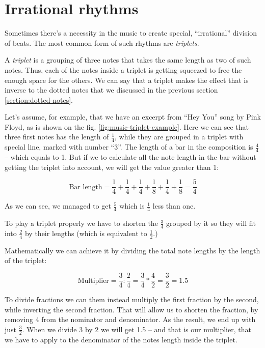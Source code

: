 \documentclass[../sparc.tex]{subfiles}
\begin{document}
\section{Irrational rhythms}

Sometimes there's a necessity in the music to create special, ``irrational''
division of beats.  The most common form of such rhythms are \emph{triplets}.

A \emph{triplet} is a grouping of three notes that takes the same length as two
of such notes.  Thus, each of the notes inside a triplet is getting squeezed to
free the enough space for the others.  We can say that a triplet makes the
effect that is inverse to the dotted notes that we discussed in the previous
section \ref{section:dotted-notes}.


Let's assume, for example, that we have an excerpt from ``Hey You'' song by Pink
Floyd, as is shown on the fig. \ref{fig:music-triplet-example}.  Here we can see
that three first notes has the length of $\frac{1}{4}$, while they are grouped
in a triplet with special line, marked with number ``3''.  The length of a bar
in the composition is $\frac{4}{4}$ -- which equals to 1.  But if we to calculate
all the note length in the bar without getting the triplet into account, we will
get the value greater than 1:

\begin{equation}
  \mbox{Bar length} = \frac{1}{4} + \frac{1}{4}
  + \frac{1}{4} + \frac{1}{8} + \frac{1}{4} + \frac{1}{8} = \frac{5}{4}
\end{equation}

As we can see, we managed to get $\frac{5}{4}$ which is $\frac{1}{4}$ less than
one.

To play a triplet properly we have to shorten the $\frac{3}{4}$ grouped by it so
they will fit into $\frac{2}{4}$ by their lengths (which is equivalent to
$\frac{1}{2}$.)

Mathematically we can achieve it by dividing the total note lengths by the
length of the triplet:

\begin{equation}
  \mbox{Multiplier} = \frac{3}{4} : \frac{2}{4} = \frac{3}{4} * \frac{4}{2}
  = \frac{3}{2} = 1.5
\end{equation}

To divide fractions we can them instead multiply the first fraction by the
second, while inverting the second fraction.  That will allow us to shorten the
fraction, by removing 4 from the nominator and denominator.  As the result, we
end up with just $\frac{3}{2}$.  When we divide 3 by 2 we will get 1.5 -- and
that is our multiplier, that we have to apply to the denominator of the notes
length inside the triplet.
\end{document}
